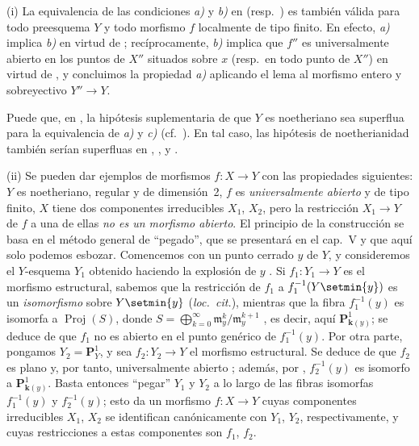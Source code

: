 \begin{remarks}[14.4.10]
\label{IV.14.4.10}
(i) La equivalencia de las condiciones \emph{a)} y \emph{b)} en  (resp.\ ) es también válida para todo preesquema $Y$ y todo morfismo $f$ localmente de tipo finito.
En efecto, \emph{a)} implica \emph{b)} en virtud de ; recíprocamente, \emph{b)} implica que $f''$ es universalmente abierto en los puntos de $X''$ situados sobre $x$ (resp.\ en todo punto de $X''$) en virtud de , y concluimos la propiedad \emph{a)} aplicando el lema  al morfismo entero y sobreyectivo $Y''\to Y$.

Puede que, en , la hipótesis suplementaria de que $Y$ es noetheriano sea superflua para la equivalencia de \emph{a)} y \emph{c)} (cf.\ ).
En tal caso, las hipótesis de noetherianidad también serían superfluas en , ,  y .

(ii) Se pueden dar ejemplos de morfismos $f:X\to Y$ con las propiedades siguientes: $Y$ es noetheriano, regular y de dimensión~2, $f$ es \emph{universalmente abierto} y de tipo finito, $X$ tiene dos componentes irreducibles $X_1$, $X_2$, pero la restricción $X_1\to Y$ de $f$ a una de ellas \emph{no es un morfismo abierto}.
El principio de la construcción se basa en el método general de ``pegado'', que se presentará en el cap.~V y que aquí solo podemos esbozar.
Comencemos con un punto cerrado $y$ de $Y$, y consideremos el $Y$-esquema $Y_1$ obtenido haciendo la explosión de $y$ . Si $f_1:Y_1\to Y$ es el morfismo estructural, sabemos que la restricción de $f_1$ a $f_1^{-1}(Y\setmin\{y\})$ es un \emph{isomorfismo} sobre $Y\setmin\{y\}$ (\emph{loc.\ cit.}), mientras que la fibra $f_1^{-1}(y)$ es isomorfa a $\operatorname{Proj}(S)$, donde $S=\bigoplus_{k=0}^{\infty}\mathfrak{m}_y^k/\mathfrak{m}_y^{k+1}$ , es decir, aquí $\mathbf{P}^1_{\mathbf{k}(y)}$; se deduce de  que $f_1$ no es abierto en el punto genérico de $f_1^{-1}(y)$.
Por otra parte, pongamos $Y_2=\mathbf{P}^1_Y$, y sea $f_2:Y_2\to Y$ el morfismo estructural. Se deduce de  que $f_2$ es plano y, por tanto, universalmente abierto ; además, por , $f_2^{-1}(y)$ es isomorfo a $\mathbf{P}^1_{\mathbf{k}(y)}$. Basta entonces ``pegar'' $Y_1$ y $Y_2$ a lo largo de las fibras isomorfas $f_1^{-1}(y)$ y $f_2^{-1}(y)$; esto da un morfismo $f:X\to Y$ cuyas componentes irreducibles $X_1$, $X_2$ se identifican canónicamente con $Y_1$, $Y_2$, respectivamente, y cuyas restricciones a estas componentes son $f_1$, $f_2$.


\end{remarks}
